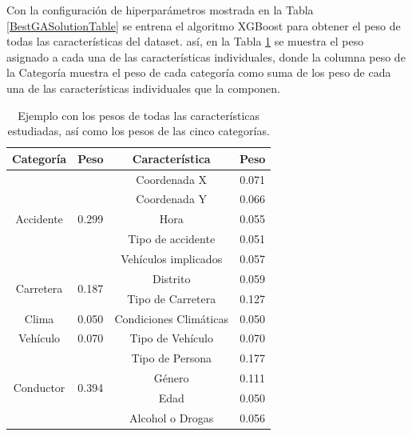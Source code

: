 
Con la configuración de hiperparámetros mostrada en la Tabla \ref{BestGASolutionTable} se entrena el algoritmo XGBoost para obtener el peso de todas las  características del dataset. así, en la Tabla \ref{1stPaperWeightsFinalCharacteristics} se muestra el peso asignado a cada una de las características individuales, donde la columna peso de la Categoría muestra el peso de cada categoría como suma de los peso de cada una de las  características individuales que la componen.


\begin{table}[ht]
	\centering
	\begin{tabular}{ |c|c||c|c| }
		\hline
		\textbf{Categoría} & \textbf{Peso} & \textbf{Característica} & \textbf{Peso}\\
		\hline
		\hline
		\multirow{5}{*}{Accidente}   & \multirow{5}{*}{0.299} & Coordenada X & 0.071\\
		&  & Coordenada Y  & 0.066\\
		&  & Hora & 0.055\\
		&  & Tipo de accidente  & 0.051\\
		&  & Vehículos implicados & 0.057\\
		\hline
		
		\multirow{2}{*}{Carretera} & \multirow{2}{*}{0.187} & Distrito  & 0.059\\      
		&  & Tipo de Carretera & 0.127\\
		\hline
		
		\multirow{1}{*}{Clima}  & \multirow{1}{*}{0.050}  & Condiciones Climáticas  & 0.050\\
		\hline
		
		\multirow{1}{*}{Vehículo}  & \multirow{1}{*}{0.070} & Tipo de Vehículo  & 0.070\\
		\hline
		
		\multirow{4}{*}{Conductor}   & \multirow{4}{*}{0.394} & Tipo de Persona & 0.177\\
		&      & Género      & 0.111\\
		&      & Edad      & 0.050\\
		&      & Alcohol o Drogas  & 0.056\\
		\hline
		
	\end{tabular}
	\caption{Ejemplo con los pesos de todas las características estudiadas, así como los pesos de las cinco categorías.}
	\label{1stPaperWeightsFinalCharacteristics}
\end{table}

